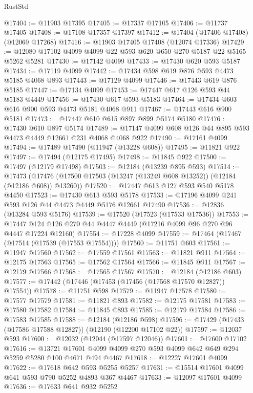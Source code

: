 \begin{lexlean}{RustStd}
\begin{coremodule}
@17404 := @11903 @17395
@17405 := @17337 @17105
@17406 := @11737 @17405
@17408 := @17108 @17357 @17397
@17412 := @17404 (@17406 @17408) (@12069 @17268)
@17416 := @11903 @17405 @17408 (@12074 @17336)
@17429 := @12080 @17102 @4099 @4099 @22 @593 @620 @650 @270 @5187 @22 @5165 @5262 @5281
@17430 := @17142 @4099
@17433 := @17430 @620 @593 @5187
@17434 := @17119 @4099
@17442 := @17434 @598 @619 @876 @593 @4473 @5185 @4068 @893
@17443 := @17129 @4099
@17446 := @17443 @619 @876 @5185
@17447 := @17134 @4099
@17453 := @17447 @617 @126 @593 @44 @5183 @4449
@17456 := @17430 @617 @593 @5183
@17464 := @17434 @603 @616 @900 @593 @4473 @5181 @4068 @911
@17467 := @17443 @616 @900 @5181
@17473 := @17447 @610 @615 @897 @899 @5174 @5180
@17476 := @17430 @610 @897 @5174
@17489 := @17147 @4099 @608 @126 @44 @895 @593 @4473 @4449 @12661 @231 @4068 @4068 @922
@17490 := @17161 @4099
@17494 := @17489 @17490 (@11947 (@13228 @608))
@17495 := @11821 @922
@17497 := @17494 (@12175 @17495)
@17498 := @11845 @922
@17500 := @17497 (@12179 @17498)
@17503 := @12184 (@13239 @895 @593)
@17514 := @17473
    (@17476 (@17500 @17503 (@13247 (@13249 @608 @13252)) (@12184 (@12186 @608)) @13260))
@17520 := @17447 @613 @127 @593 @540 @5178 @4450
@17523 := @17430 @613 @593 @5178
@17533 := @17196 @4099 @241 @593 @126 @44 @4473 @4449 @5176 @12661 @17490
@17536 := @12836 (@13284 @593 @5176)
@17539 := @17520 (@17523 (@17533 @17536))
@17553 := @17447 @124 @126 @270 @44 @4447 @4449 (@17216 @4099 @96 @270 @96 @4447 @17224 @12160)
@17554 := @17228 @4099
@17559 := @17464 (@17467 (@17514 (@17539 (@17553 @17554))))
@17560 := @11751 @603
@17561 := @11947 @17560
@17562 := @17559 @17561
@17563 := @11821 @911
@17564 := @12175 @17563
@17565 := @17562 @17564
@17566 := @11845 @911
@17567 := @12179 @17566
@17568 := @17565 @17567
@17570 := @12184 (@12186 @603)
@17577 := @17442 (@17446 (@17453 (@17456 (@17568 @17570 @12827)) @17554))
@17578 := @11751 @598
@17579 := @11947 @17578
@17580 := @17577 @17579
@17581 := @11821 @893
@17582 := @12175 @17581
@17583 := @17580 @17582
@17584 := @11845 @893
@17585 := @12179 @17584
@17586 := @17583 @17585
@17588 := @12184 (@12186 @598)
@17596 := @17429 (@17433 (@17586 @17588 @12827)) (@12190 (@12200 @17102 @22))
@17597 := @12037 @593
@17600 := @12032 (@12044 (@17597 @12046))
@17601 := @17600 @17102
@17616 := @13721 @17601 @4099 @4099 @270 @593 @4099 @642 @649 @294 @5259 @5280 @100 @4671 @494 @4467
@17618 := @12227 @17601 @4099
@17622 := @17618 @642 @593 @5255 @5257
@17631 := @15514 @17601 @4099 @641 @593 @790 @5252 @4893 @367 @4467
@17633 := @12097 @17601 @4099
@17636 := @17633 @641 @932 @5252

\end{coremodule}
\end{lexlean}
